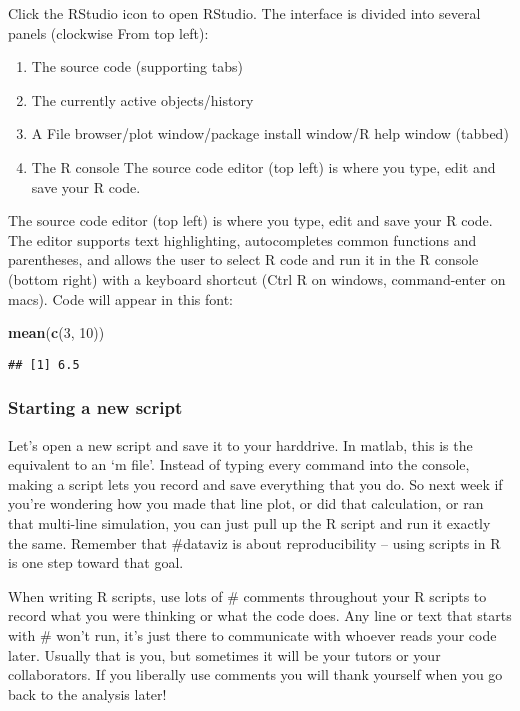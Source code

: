 \documentclass[]{article}
\newenvironment{Shaded}{\begin{snugshade}}{\end{snugshade}}
\newcommand{\DecValTok}[1]{\textcolor[rgb]{0.00,0.00,0.81}{#1}}
\newcommand{\KeywordTok}[1]{\textcolor[rgb]{0.13,0.29,0.53}{\textbf{#1}}}
\newcommand{\NormalTok}[1]{#1}
\providecommand{\tightlist}{%
  \setlength{\itemsep}{0pt}\setlength{\parskip}{0pt}}
\begin{document}
Click the RStudio icon to open RStudio. The interface is divided into
several panels (clockwise From top left):

\begin{enumerate}
\def\labelenumi{\arabic{enumi}.}
\tightlist
\item
  The source code (supporting tabs)
\item
  The currently active objects/history
\item
  A File browser/plot window/package install window/R help window
  (tabbed)
\item
  The R console The source code editor (top left) is where you type,
  edit and save your R code.
\end{enumerate}

The source code editor (top left) is where you type, edit and save your
R code. The editor supports text highlighting, autocompletes common
functions and parentheses, and allows the user to select R code and run
it in the R console (bottom right) with a keyboard shortcut (Ctrl R on
windows, command-enter on macs). Code will appear in this font:

\begin{Shaded}
\begin{Highlighting}[]
\KeywordTok{mean}\NormalTok{(}\KeywordTok{c}\NormalTok{(}\DecValTok{3}\NormalTok{, }\DecValTok{10}\NormalTok{))}
\end{Highlighting}
\end{Shaded}

\begin{verbatim}
## [1] 6.5
\end{verbatim}

\hypertarget{starting-a-new-script}{%
\subsubsection{Starting a new script}\label{starting-a-new-script}}

Let's open a new script and save it to your harddrive. In matlab, this
is the equivalent to an `m file'. Instead of typing every command into
the console, making a script lets you record and save everything that
you do. So next week if you're wondering how you made that line plot, or
did that calculation, or ran that multi-line simulation, you can just
pull up the R script and run it exactly the same. Remember that
\#dataviz is about reproducibility -- using scripts in R is one step
toward that goal.

When writing R scripts, use lots of \# comments throughout your R
scripts to record what you were thinking or what the code does. Any line
or text that starts with \# won't run, it's just there to communicate
with whoever reads your code later. Usually that is you, but sometimes
it will be your tutors or your collaborators. If you liberally use
comments you will thank yourself when you go back to the analysis later!
\end{document}

